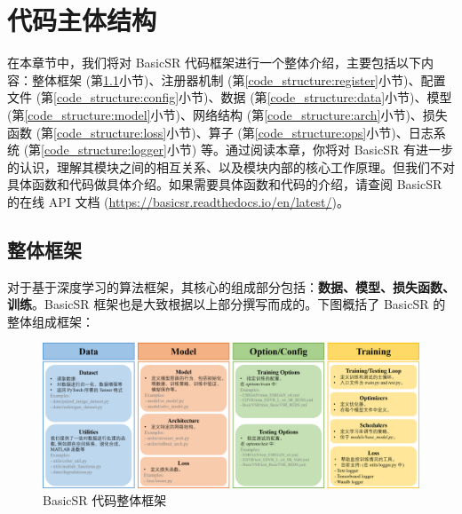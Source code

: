 \documentclass[../main.tex]{subfiles}
\begin{document}
\chapter{代码主体结构}
\vspace{-2cm}

在本章节中，我们将对 BasicSR 代码框架进行一个整体介绍，主要包括以下内容：整体框架 (第\ref{code_structure:overview}小节)、注册器机制 (第\ref{code_structure:register}小节)、配置文件 (第\ref{code_structure:config}小节)、数据 (第\ref{code_structure:data}小节)、模型 (第\ref{code_structure:model}小节)、网络结构 (第\ref{code_structure:arch}小节)、损失函数 (第\ref{code_structure:loss}小节)、算子 (第\ref{code_structure:ops}小节)、日志系统  (第\ref{code_structure:logger}小节) 等。通过阅读本章，你将对 BasicSR 有进一步的认识，理解其模块之间的相互关系、以及模块内部的核心工作原理。但我们不对具体函数和代码做具体介绍。如果需要具体函数和代码的介绍，请查阅 BasicSR 的在线 API 文档 (\url{https://basicsr.readthedocs.io/en/latest/})。

\section{整体框架} \label{code_structure:overview}

对于基于深度学习的算法框架，其核心的组成部分包括：\textbf{数据、模型、损失函数、训练}。BasicSR 框架也是大致根据以上部分撰写而成的。下图概括了 BasicSR 的整体组成框架：

\begin{figure}[htbp]
    \begin{center}
        \includegraphics[width=1\linewidth]{figures/code_structure_overview.png}
    \end{center}
    \caption{BasicSR 代码整体框架}
    \label{fig:main_framework}
\end{figure}
\end{document}
